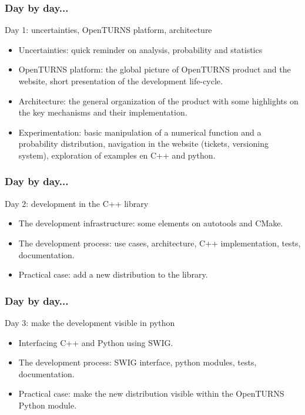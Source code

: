 \documentclass{beamer}
\begin{document}
\begin{frame}
  \frametitle{Day by day...}
  \begin{block}{Day 1: uncertainties, OpenTURNS platform, architecture}
    \begin{itemize}
    \item Uncertainties: quick reminder on analysis, probability and statistics
    \item OpenTURNS platform: the global picture of OpenTURNS product and the website, short presentation of the development life-cycle.
    \item Architecture: the general organization of the product with some highlights on the key mechanisms and their implementation.
    \item Experimentation: basic manipulation of a numerical function and a probability distribution, navigation in the website (tickets, versioning system), exploration of examples en C++ and python.
    \end{itemize}
  \end{block}
\end{frame}
\begin{frame}
  \frametitle{Day by day...}
  \begin{block}{Day 2: development in the C++ library}
    \begin{itemize}
    \item The development infrastructure: some elements on autotools and CMake.
    \item The development process: use cases, architecture, C++ implementation, tests, documentation.
    \item Practical case: add a new distribution to the library.
    \end{itemize}
  \end{block}
\end{frame}
\begin{frame}
  \frametitle{Day by day...}
  \begin{block}{Day 3: make the development visible in python}
    \begin{itemize}
    \item Interfacing C++ and Python using SWIG.
    \item The development process: SWIG interface, python modules, tests, documentation.
    \item Practical case: make the new distribution visible within the OpenTURNS Python module.
    \end{itemize}
  \end{block}
\end{frame}
\end{document}
